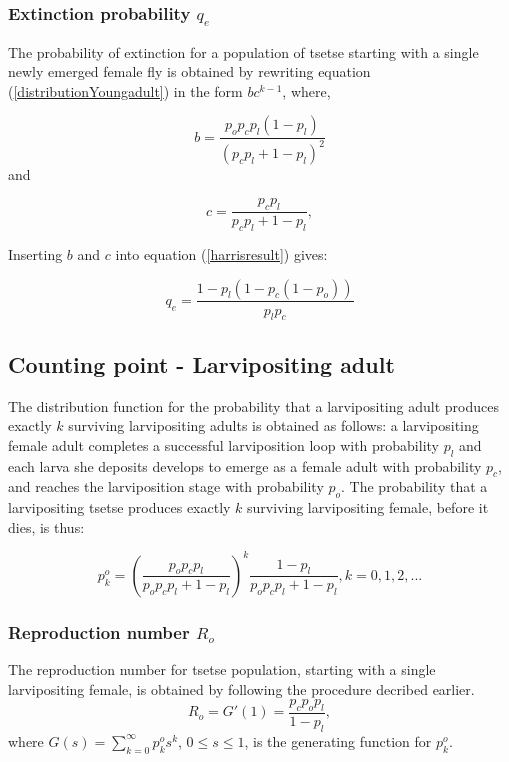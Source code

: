 \subsubsection{Extinction probability  $q_{e}$}

The probability of extinction for a population of tsetse starting with a single newly emerged female fly is obtained by rewriting equation (\ref{distributionYoungadult}) in the form $bc^{k-1}$, where,

$$ b = \frac{p_{o}p_{c}p_{l}(1-p_{l})}{(p_{c}p_{l} + 1 - p_{l})^{2}} $$ and

$$ c = \frac{p_{c}p_{l}}{p_{c}p_{l} + 1 - p_{l}} , $$ 

Inserting $b$ and $c$ into equation (\ref{harrisresult}) gives:

\begin{equation}
\label{extinctionYoungadult}
q_{e} = \frac{1- p_{l}(1 -p_{c}(1- p_{o}))}{p_{l}p_{c}}
\end{equation}


\subsection{Counting point - Larvipositing adult}

The distribution function for the probability that a larvipositing  adult produces exactly $k$ surviving larvipositing adults is obtained as follows: a larvipositing female adult completes  a successful  larviposition loop with probability $p_{l}$ and each larva she deposits develops to emerge as a female adult with probability $p_{c}$, and reaches the larviposition stage with probability $p_{o}$.  The probability that a larvipositing tsetse produces exactly $k$ surviving larvipositing female, before it dies, is thus:

\begin{equation}
\label{OvulatingAdultdistribution}
p_{k}^{o} = (\frac{p_{o}p_{c}p_{l}}{p_{o}p_{c}p_{l} + 1 - p_{l}})^{k}\frac{1 - p_{l}}{p_{o}p_{c}p_{l} + 1 - p_{l}}, k =0,1,2,...
\end{equation}




\subsubsection{Reproduction number $R_{o}$}
The reproduction number for tsetse population, starting with a single larvipositing female, is obtained by following the procedure decribed earlier. 
\begin{equation}
\label{OvulatingadultreproductiveNum}
R_{o} = G'(1) = \frac{p_{c}p_{o}p_{l}}{1-p_{l}},
\end{equation}  
where $G(s) = \sum_{k=0}^{\infty} p_{k}^{o}s^{k}  $, $0\leq s \leq 1$, is the generating function for $p_{k}^{o}$.

